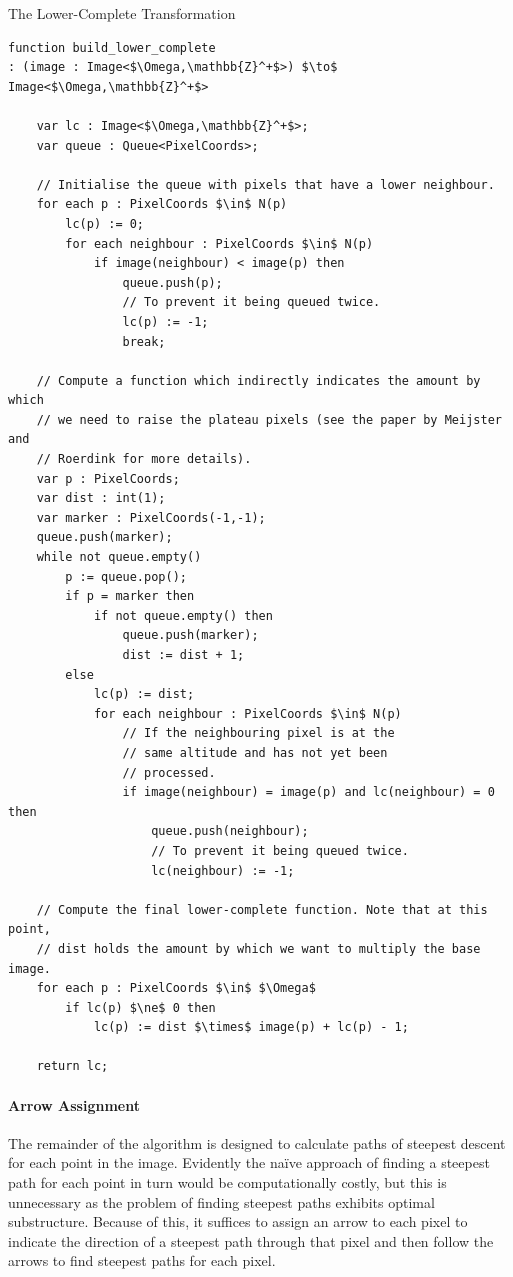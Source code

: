 \begin{stulisting}[p]
\caption{The Lower-Complete Transformation}
\label{code:segmentation-watershed-lowercomplete}
\begin{lstlisting}[style=Default]
function build_lower_complete
: (image : Image<$\Omega,\mathbb{Z}^+$>) $\to$ Image<$\Omega,\mathbb{Z}^+$>

	var lc : Image<$\Omega,\mathbb{Z}^+$>;
	var queue : Queue<PixelCoords>;

	// Initialise the queue with pixels that have a lower neighbour.
	for each p : PixelCoords $\in$ N(p)
		lc(p) := 0;
		for each neighbour : PixelCoords $\in$ N(p)
			if image(neighbour) < image(p) then
				queue.push(p);
				// To prevent it being queued twice.
				lc(p) := -1;
				break;

	// Compute a function which indirectly indicates the amount by which
	// we need to raise the plateau pixels (see the paper by Meijster and
	// Roerdink for more details).
	var p : PixelCoords;
	var dist : int(1);
	var marker : PixelCoords(-1,-1);
	queue.push(marker);
	while not queue.empty()
		p := queue.pop();
		if p = marker then
			if not queue.empty() then
				queue.push(marker);
				dist := dist + 1;
		else
			lc(p) := dist;
			for each neighbour : PixelCoords $\in$ N(p)
				// If the neighbouring pixel is at the
				// same altitude and has not yet been
				// processed.
				if image(neighbour) = image(p) and lc(neighbour) = 0 then
					queue.push(neighbour);
					// To prevent it being queued twice.
					lc(neighbour) := -1;
	
	// Compute the final lower-complete function. Note that at this point,
	// dist holds the amount by which we want to multiply the base image.
	for each p : PixelCoords $\in$ $\Omega$
		if lc(p) $\ne$ 0 then
			lc(p) := dist $\times$ image(p) + lc(p) - 1;

	return lc;
\end{lstlisting}
\end{stulisting}

\paragraph{Arrow Assignment}

The remainder of the algorithm is designed to calculate paths of steepest descent for each point in the image. Evidently the na\"ive approach of finding a steepest path for each point in turn would be computationally costly, but this is unnecessary as the problem of finding steepest paths exhibits optimal substructure. Because of this, it suffices to assign an arrow to each pixel to indicate the direction of a steepest path through that pixel and then follow the arrows to find steepest paths for each pixel.

